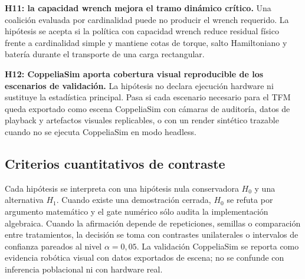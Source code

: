 \textbf{H11: la capacidad wrench mejora el tramo dinámico crítico.}
Una coalición evaluada por cardinalidad puede no producir el wrench requerido. La
hipótesis se acepta si la política con capacidad wrench reduce residual físico frente a
cardinalidad simple y mantiene cotas de torque, salto Hamiltoniano y batería durante el
transporte de una carga rectangular.

\textbf{H12: CoppeliaSim aporta cobertura visual reproducible de los escenarios de
validación.}
La hipótesis no declara ejecución hardware ni sustituye la estadística principal. Pasa
si cada escenario necesario para el TFM queda exportado como escena CoppeliaSim con
cámaras de auditoría, datos de playback y artefactos visuales replicables, o con un
render sintético trazable cuando no se ejecuta CoppeliaSim en modo headless.

\subsection{Criterios cuantitativos de contraste}
\label{subsec:criterios}

Cada hipótesis se interpreta con una hipótesis nula conservadora $H_0$ y una
alternativa $H_1$. Cuando existe una demostración cerrada, $H_0$ se refuta por argumento
matemático y el gate numérico sólo audita la implementación algebraica. Cuando la
afirmación depende de repeticiones, semillas o comparación entre tratamientos, la
decisión se toma con contrastes unilaterales o intervalos de confianza pareados al nivel
$\alpha=0{,}05$. La validación CoppeliaSim se reporta como evidencia robótica visual con
datos exportados de escena; no se confunde con inferencia poblacional ni con hardware
real.

